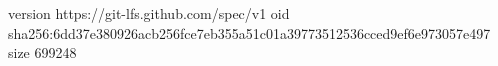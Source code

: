 version https://git-lfs.github.com/spec/v1
oid sha256:6dd37e380926acb256fce7eb355a51c01a39773512536cced9ef6e973057e497
size 699248
